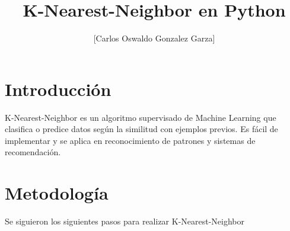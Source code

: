 \documentclass{article}
\title{K-Nearest-Neighbor en Python}
\author{[Carlos Oswaldo Gonzalez Garza]}
\begin{document}
\maketitle

\section{Introducci\'on}
K-Nearest-Neighbor es un algoritmo supervisado de Machine Learning que clasifica o predice datos según la similitud con ejemplos previos. Es fácil de implementar y se aplica en reconocimiento de patrones y sistemas de recomendación.
\section{Metodolog\'ia}
Se siguieron los siguientes pasos para realizar K-Nearest-Neighbor
\end{document}
